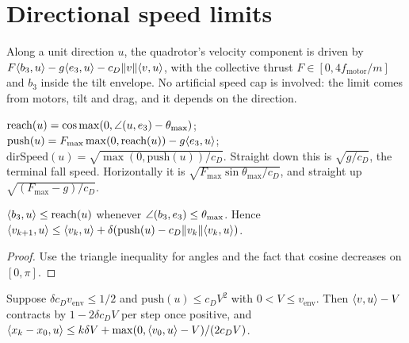 \chapter{Directional speed limits}
\label{chap:speed}

Along a unit direction $u$, the quadrotor's velocity component is driven by
$F\langle b_3, u \rangle-g\langle e_3, u \rangle-c_D\lVert v \rVert\langle v, u \rangle$, with the collective
thrust $F\in[0,4f_{\mathrm{motor}}/m]$ and $b_3$ inside the tilt envelope. No
artificial speed cap is involved: the limit comes from motors, tilt and drag, and
it depends on the direction.

\begin{definition}
\label{def:dir-speed}
\leanok
{}
$\mathrm{reach}(u)=\cos\max(0,\angle(u,e_3)-\theta_{\max})$;
$\mathrm{push}(u)=F_{\max}\max(0,\mathrm{reach}(u))-g\langle e_3, u \rangle$;
$\mathrm{dirSpeed}(u)=\sqrt{\max(0,\mathrm{push}(u))/c_D}$. Straight down this is
$\sqrt{g/c_D}$, the terminal fall speed. Horizontally it is
$\sqrt{F_{\max}\sin\theta_{\max}/c_D}$, and straight up
$\sqrt{(F_{\max}-g)/c_D}$.
\end{definition}

\begin{lemma}
\label{lem:reach}
\leanok
{}
$\langle b_3, u \rangle\le\mathrm{reach}(u)$ whenever $\angle(b_3,e_3)\le\theta_{\max}$. Hence
$\langle v_{k+1}, u \rangle\le\langle v_k, u \rangle+\delta(\mathrm{push}(u)-c_D\lVert v_k \rVert\langle v_k, u \rangle)$.
\end{lemma}

\begin{proof}
\leanok
Use the triangle inequality for angles and the fact that cosine decreases on
$[0,\pi]$.
\end{proof}

\begin{lemma}
\label{lem:dir-excess}
\leanok
{}
Suppose $\delta c_D v_{\mathrm{env}}\le1/2$ and $\mathrm{push}(u)\le c_DV^2$ with
$0<V\le v_{\mathrm{env}}$. Then $\langle v, u \rangle-V$ contracts by $1-2\delta c_DV$ per
step once positive, and
$\langle x_k-x_0, u \rangle\le k\delta V+\max(0,\langle v_0, u \rangle-V)/(2c_DV)$.
\end{lemma}

